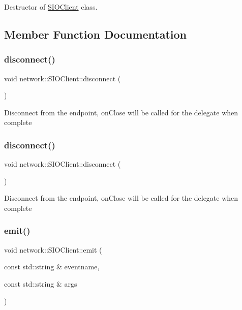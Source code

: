 Destructor of \hyperlink{classnetwork_1_1SIOClient}{S\+I\+O\+Client} class. 

\subsection{Member Function Documentation}
\mbox{\label{classnetwork_1_1SIOClient_a6c4188b812cef24b1aa9c31bb44f2cae}} 
\subsubsection{\texorpdfstring{disconnect()}{disconnect()}\hspace{0.1cm}{\footnotesize\ttfamily [1/2]}}
{\footnotesize\ttfamily void network\+::\+S\+I\+O\+Client\+::disconnect (\begin{DoxyParamCaption}{ }\end{DoxyParamCaption})}

Disconnect from the endpoint, on\+Close will be called for the delegate when complete \mbox{\label{classnetwork_1_1SIOClient_a6c4188b812cef24b1aa9c31bb44f2cae}} 
\subsubsection{\texorpdfstring{disconnect()}{disconnect()}\hspace{0.1cm}{\footnotesize\ttfamily [2/2]}}
{\footnotesize\ttfamily void network\+::\+S\+I\+O\+Client\+::disconnect (\begin{DoxyParamCaption}{ }\end{DoxyParamCaption})}

Disconnect from the endpoint, on\+Close will be called for the delegate when complete \mbox{\label{classnetwork_1_1SIOClient_a6467c540e8efb9c2f291746f0e0b7ab9}} 
\subsubsection{\texorpdfstring{emit()}{emit()}\hspace{0.1cm}{\footnotesize\ttfamily [1/2]}}
{\footnotesize\ttfamily void network\+::\+S\+I\+O\+Client\+::emit (\begin{DoxyParamCaption}\item[{const std\+::string \&}]{eventname,  }\item[{const std\+::string \&}]{args }\end{DoxyParamCaption})}

